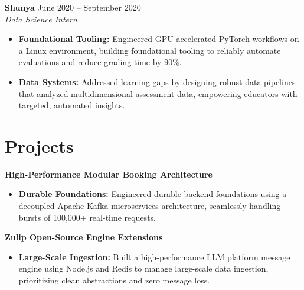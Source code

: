 \documentclass[11pt,a4paper]{article}
\begin{document}
\vspace{3pt}
\noindent
\textbf{Shunya} \hfill June 2020 -- September 2020 \\
\textit{Data Science Intern}
\begin{itemize}[leftmargin=*,noitemsep,topsep=0pt]
    \item \textbf{Foundational Tooling:} Engineered GPU-accelerated PyTorch workflows on a Linux environment, building foundational tooling to reliably automate evaluations and reduce grading time by 90\%.
    \item \textbf{Data Systems:} Addressed learning gaps by designing robust data pipelines that analyzed multidimensional assessment data, empowering educators with targeted, automated insights.
\end{itemize}

\vspace{-5pt}
\section{Projects}
\noindent
\textbf{High-Performance Modular Booking Architecture}
\begin{itemize}[leftmargin=*,noitemsep,topsep=0pt]
    \item \textbf{Durable Foundations:} Engineered durable backend foundations using a decoupled Apache Kafka microservices architecture, seamlessly handling bursts of 100,000+ real-time requests.
\end{itemize}

\vspace{3pt}
\noindent
\textbf{Zulip Open-Source Engine Extensions}
\begin{itemize}[leftmargin=*,noitemsep,topsep=0pt]
    \item \textbf{Large-Scale Ingestion:} Built a high-performance LLM platform message engine using Node.js and Redis to manage large-scale data ingestion, prioritizing clean abstractions and zero message loss.
\end{itemize}
\end{document}
